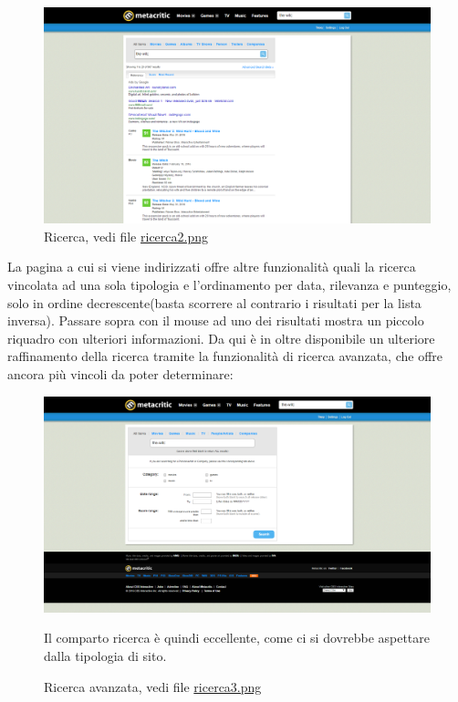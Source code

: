 \documentclass[12pt]{article}
\begin{document}
\begin{figure}[H]
	\begin{center}
		\includegraphics[width=13.5cm]{ricerca2.png}
		\caption{Ricerca, vedi file \href{ricerca2.png}{ricerca2.png}}
	\end{center}
\end{figure}
La pagina a cui si viene indirizzati offre altre funzionalità quali la ricerca vincolata ad una sola tipologia e l'ordinamento per data, rilevanza e punteggio, solo in ordine decrescente(basta scorrere al contrario i risultati per la lista inversa).
Passare sopra con il mouse ad uno dei risultati mostra un piccolo riquadro con ulteriori informazioni.
Da qui è in oltre disponibile un ulteriore raffinamento della ricerca tramite la funzionalità di ricerca avanzata, che offre ancora più vincoli da poter determinare:
\begin{figure}[H]
\begin{center}
	\includegraphics[width=13.5cm]{ricerca3.png}
	\caption{Ricerca avanzata, vedi file \href{ricerca3.png}{ricerca3.png}}
\end{center}
Il comparto ricerca è quindi eccellente, come ci si dovrebbe aspettare dalla tipologia di sito.
\end{figure}
\newpage
\end{document}

